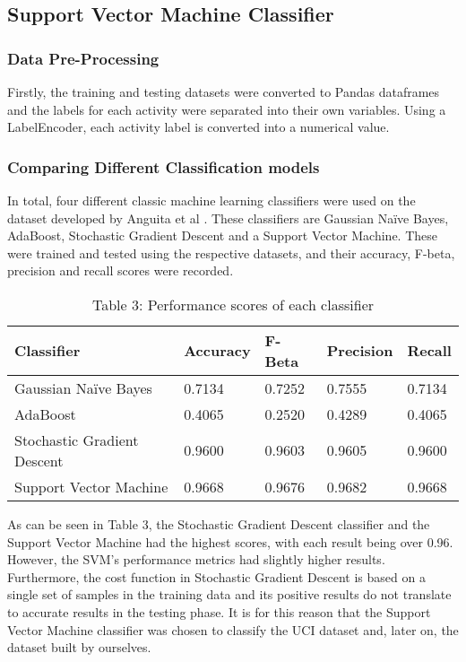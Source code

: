 \subsection{Support Vector Machine Classifier}
\subsubsection{Data Pre-Processing}
    Firstly, the training and testing datasets were converted to Pandas dataframes and the labels for each activity were separated into their own variables.
    Using a LabelEncoder, each activity label is converted into a numerical value.

\subsubsection{Comparing Different Classification models}
    In total, four different classic machine learning classifiers were used on the dataset developed by Anguita et al \cite{Anguita2012}. These classifiers are Gaussian Naïve Bayes,
    AdaBoost, Stochastic Gradient Descent and a Support Vector Machine. These were trained and tested using the respective datasets, and their accuracy,
    F-beta, precision and recall scores were recorded.

    \begin{table}[ht]
        \centering\scriptsize
        \begin{tabular}{|l|l|l|l|l|}
            \hline
            \textbf{Classifier} & \textbf{Accuracy} & \textbf{F-Beta}  & \textbf{Precision} & \textbf{Recall} \\ \hline
            Gaussian Naïve Bayes             & 0.7134           & 0.7252  & 0.7555 & 0.7134 \\ \hline
            AdaBoost            & 0.4065           & 0.2520 & 0.4289 & 0.4065 \\ \hline
            Stochastic Gradient Descent               & 0.9600           & 0.9603 & 0.9605 & 0.9600 \\ \hline
            Support Vector Machine            & 0.9668           & 0.9676 & 0.9682 & 0.9668 \\ \hline
        \end{tabular}
        \caption*{Table 3: Performance scores of each classifier}
    \end{table}

    As can be seen in Table 3, the Stochastic Gradient Descent classifier and the Support Vector Machine had the highest scores, with each result being over 0.96.
    However, the SVM's performance metrics had slightly higher results. Furthermore, the cost function in Stochastic Gradient Descent is based on a single set of samples
    in the training data and its positive results do not translate to accurate results in the testing phase. It is for this reason that the Support Vector Machine classifier
    was chosen to classify the UCI dataset \cite{Anguita2013} and, later on, the dataset built by ourselves.

